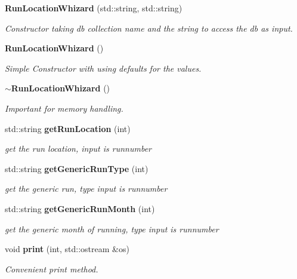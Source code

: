 \begin{DoxyCompactItemize}
\item 
{\bf Run\-Location\-Whizard} (std\-::string, std\-::string)\label{classCALICE_1_1RunLocationWhizard_a095f755854c8c2fec432ff278f9ba36a}

\begin{DoxyCompactList}\small\item\em Constructor taking db collection name and the string to access the db as input. \end{DoxyCompactList}\item 
{\bf Run\-Location\-Whizard} ()\label{classCALICE_1_1RunLocationWhizard_a5f638ca8c316fcd8cb9c0f0f23d05514}

\begin{DoxyCompactList}\small\item\em Simple Constructor with using defaults for the values. \end{DoxyCompactList}\item 
{\bf $\sim$\-Run\-Location\-Whizard} ()\label{classCALICE_1_1RunLocationWhizard_a9de4453338108b8466a145c0604604c4}

\begin{DoxyCompactList}\small\item\em Important for memory handling. \end{DoxyCompactList}\item 
std\-::string {\bf get\-Run\-Location} (int)\label{classCALICE_1_1RunLocationWhizard_a3db0d8e2c9290da2ff053df78a6c1d58}

\begin{DoxyCompactList}\small\item\em get the run location, input is runnumber \end{DoxyCompactList}\item 
std\-::string {\bf get\-Generic\-Run\-Type} (int)\label{classCALICE_1_1RunLocationWhizard_a600a0bd53a7bb09075e1ed3c96fa3ee2}

\begin{DoxyCompactList}\small\item\em get the generic run, type input is runnumber \end{DoxyCompactList}\item 
std\-::string {\bf get\-Generic\-Run\-Month} (int)\label{classCALICE_1_1RunLocationWhizard_a2ab07e3feac0ec3dc7f71df06029a7b6}

\begin{DoxyCompactList}\small\item\em get the generic month of running, type input is runnumber \end{DoxyCompactList}\item 
void {\bf print} (int, std\-::ostream \&os)\label{classCALICE_1_1RunLocationWhizard_a361b56dadac488123034eec312ad891c}

\begin{DoxyCompactList}\small\item\em Convenient print method. \end{DoxyCompactList}\end{DoxyCompactItemize}
